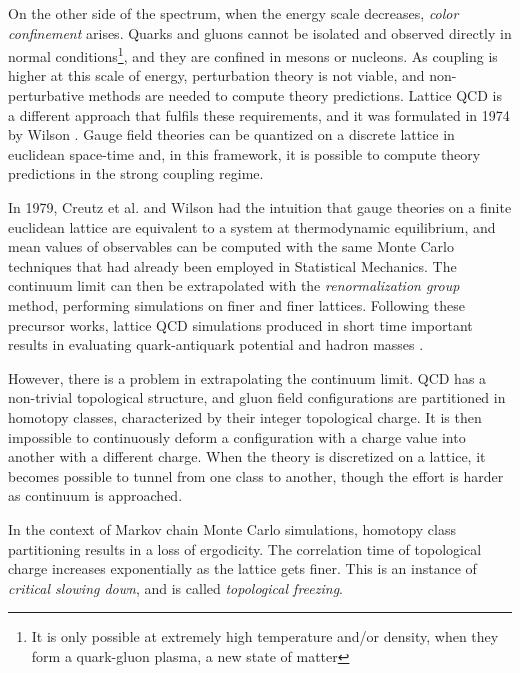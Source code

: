 On the other side of the spectrum, when the energy scale decreases, \emph{color confinement} arises.
Quarks and gluons cannot be isolated and observed directly in normal conditions\footnote{It is only possible at extremely high temperature and/or density, when they form a quark-gluon plasma, a new state of matter},
and they are confined in mesons or nucleons.
As coupling is higher at this scale of energy, perturbation theory is not viable, and non-perturbative methods are needed to compute theory predictions.
Lattice QCD is a different approach that fulfils these requirements, and it was formulated in 1974 by Wilson \cite{wilson:1974}.
Gauge field theories can be quantized on a discrete lattice in euclidean space-time and,
in this framework, it is possible to compute theory predictions in the strong coupling regime.

In 1979, Creutz et al. \cite{creutz:1979} and Wilson \cite{wilson:1980}
had the intuition that gauge theories on a finite euclidean lattice are equivalent to a system at thermodynamic equilibrium,
and mean values of observables can be computed with the same Monte Carlo techniques that had already been employed in Statistical Mechanics.
The continuum limit can then be extrapolated with the \emph{renormalization group} method, performing simulations on finer and finer lattices.
Following these precursor works, lattice QCD simulations produced in short time important results in evaluating quark-antiquark potential and hadron masses
\cite{creutz:1980, hamber-parisi:1981, weingarten:1982}.

However, there is a problem in extrapolating the continuum limit.
QCD has a non-trivial topological structure, and gluon field configurations are partitioned in homotopy classes, characterized by their integer topological charge.
It is then impossible to continuously deform a configuration with a charge value into another with a different charge.
When the theory is discretized on a lattice, it becomes possible to tunnel from one class to another,
though the effort is harder as continuum is approached.

In the context of Markov chain Monte Carlo simulations, homotopy class partitioning results in a loss of ergodicity.
The correlation time of topological charge increases exponentially as the lattice gets finer.
This is an instance of \emph{critical slowing down}, and is called \emph{topological freezing}.

